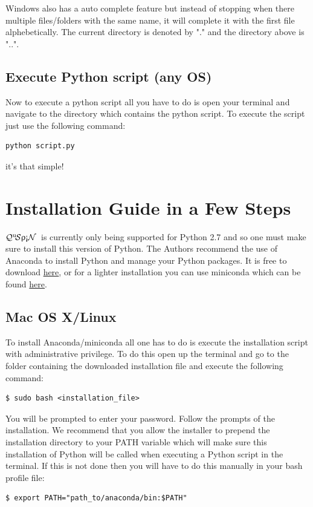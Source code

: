\documentclass{SciPost}
\newcommand\0{\scalebox{-1}[1]{0}}
\newcommand{\qspin}{$\mathcal{Q}^{\mathrm{u}}\!\mathcal{S}\uprho\mathrm{\text{\textexclamdown}}\mathcal{N}$}
\begin{document}
\begin{appendix}
\begin{itemize}
\end{itemize}
Windows also has a auto complete feature but instead of stopping when there multiple files/folders with the same name, it will complete it with the first file alphebetically. The current directory is denoted by "." and the directory above is "..".

\subsection{Execute Python script (any OS)}
%
Now to execute a python script all you have to do is open your terminal and navigate to the directory which contains the python script. To execute the script just use the following command:
\begin{lstlisting}[numbers=none]
python script.py
\end{lstlisting}
it's that simple!

\section{Installation Guide in a Few Steps}
\label{app:install}

\qspin\ is currently only being supported for Python 2.7 and so one must make sure to install this version of Python. The Authors recommend the use of Anaconda to install Python and manage your Python packages. It is free to download \href{https://www.continuum.io/downloads}{here}, or for a lighter installation you can use miniconda which can be found \href{http://conda.pydata.org/miniconda.html}{here}. 

\subsection{Mac OS X/Linux}
To install Anaconda/miniconda all one has to do is execute the installation script with administrative privilege. To do this open up the terminal and go to the folder containing the downloaded installation file and execute the following command: 
\begin{lstlisting}[numbers=none]
$ sudo bash <installation_file>
\end{lstlisting}
You will be prompted to enter your password. Follow the prompts of the installation. We recommend that you allow the installer to prepend the installation directory to your PATH variable which will make sure this installation of Python will be called when executing a Python script in the terminal. If this is not done then you will have to do this manually in your bash profile file:
\begin{lstlisting}[numbers=none]
$ export PATH="path_to/anaconda/bin:$PATH"
\end{lstlisting}


\end{appendix}
\end{document}
